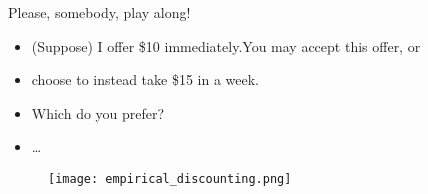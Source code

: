 \pause Please, somebody, play along!\pause 

\begin{itemize}
    \item (Suppose) I offer \$10 immediately.\pause You may accept this offer, or
    \item choose to instead take \$15 in a week. \pause
    \item Which do you prefer? \pause
    \item \ldots \pause
\end{itemize}
\vfill
\begin{figure}[h]
    \centering
    \texttt{[image: empirical\_discounting.png]}
\end{figure}


